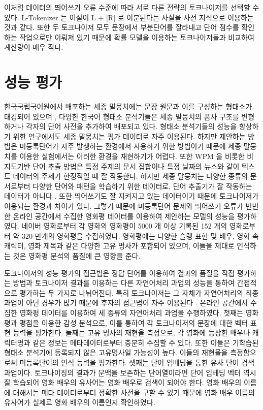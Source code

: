 \documentclass[oneside, ko,phd]{snuthesis_utf8_kor}
\begin{document}
이처럼 데이터의 띄어쓰기 오류 수준에 따라 서로 다른 전략의 토크나이저를 선택할 수 있다.
L-Tokenizer 는 어절이 L + [R] 로 이분된다는 사실을 사전 지식으로 이용하는 것과 같다.
또한 두 토크나이저 모두 문장에서 부분단어를 잘라내고 단어 점수를 확인하는 작업으로만 이뤄져 있기 때문에 확률 모델을 이용하는 토크나이저들과 비교하여 계산량이 매우 작다.


\section{성능 평가}
한국국립국어원에서 배포하는 세종 말뭉치에는 문장 원문과 이를 구성하는 형태소가 태깅되어 있으며 \cite{kim200121st}, 다양한 한국어 형태소 분석기들은 세종 말뭉치의 품사 구조를 변형하거나 각자의 단어 사전을 추가하여 배포되고 있다.
형태소 분석기들의 성능을 향상하기 위한 연구에서도 세종 말뭉치는 평가 데이터로 자주 이용된다.
하지만 제안하는 방법은 미등록단어가 자주 발생하는 환경에서 사용하기 위한 방법이기 때문에 세종 말뭉치를 이용한 실험에서는 이러한 환경을 재현하기가 어렵다.
또한 WPM 을 비롯한 비지도기반 단어 추출 방법은 특정 주제의 문서 집합이나 특정 날짜의 뉴스와 같이 텍스트 데이터의 주제가 한정적일 때 잘 작동한다.
하지만 세종 말뭉치는 다양한 종류의 문서로부터 다양한 단어와 패턴을 학습하기 위한 데이터로, 단어 추출기가 잘 작동하는 데이터가 아니다 \cite{kim2014kr}.
또한 띄어쓰기도 잘 지켜지고 있는 데이터이기 때문에 토크나이저가 이용되는 환경과 차이가 있다.
그렇기 때문에 미등록단어 문제와 띄어쓰기 오류가 빈번한 온라인 공간에서 수집한 영화평 데이터를 이용하여 제안하는 모델의 성능을 평가하였다.
네이버 영화로부터 각 영화의 영화평이 5000 개 이상 기록된 152 개의 영화로부터 약 320 만개의 영화평을 수집하였다.
영화평에는 다양한 슬랭 표현 및 배우, 영화 속 캐릭터, 영화 제목과 같은 다양한 고유 명사가 포함되어 있으며, 이들을 제대로 인식하는 것은 영화평 분석의 품질에 큰 영향을 준다.

토크나이저의 성능 평가의 접근법은 정답 단어를 이용하여 결과의 품질을 직접 평가하는 방법과 토크나이저 결과를 이용하는 다른 자연어처리 과업의 성능을 통하여 간접적으로 평가하는 두 가지로 나뉘어진다.
특히 토크나이저는 그 자체가 자연어처리의 최종 과업이 아닌 경우가 많기 때문에 후자의 접근법이 자주 이용된다 \cite{chung2009unsupervised}.
온라인 공간에서 수집한 영화평 데이터를 이용하여 세 종류의 자연어처리 과업을 수행하였다.
첫째는 영화평과 평점을 이용한 감성 분석으로, 이를 통하여 각 토크나이저의 문장에 대한 벡터 표현 능력을 평가한다.
둘째는 고유 명사의 재현율 측정으로, 각 영화에 등장한 배우나 캐릭터명과 같은 정보는 메타데이터로부터 충분히 수집할 수 있다.
또한 이들은 기학습된 형태소 분석기에 등록되지 않은 고유명사일 가능성이 높다.
이들의 재현율을 측정함으로써 미등록단어의 인식 능력을 평가한다.
셋째는 단어 임베딩을 통한 유사 단어 검색 과업이다.
토크나이징의 결과가 문맥을 보존하는 단어열이라면 단어 임베딩 벡터 역시 잘 학습되어 영화 배우의 유사어는 영화 배우로 검색이 되어야 한다.
영화 배우의 이름에 대해서는 메타 데이터로부터 정확한 사전을 구할 수 있기 때문에 영화 배우 이름의 유사어가 실제로 영화 배우의 이름인지 확인하였다.
\end{document}
